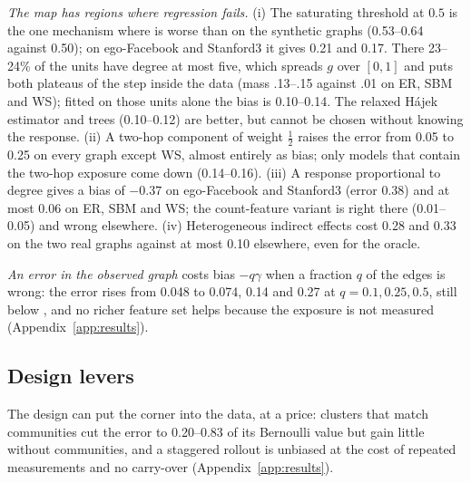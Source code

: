 \emph{The map has regions where regression fails.} (i) The saturating threshold at $0.5$ is the one mechanism where  is worse than  on the synthetic graphs (0.53--0.64 against 0.50); on ego-Facebook and Stanford3 it gives 0.21 and 0.17. There 23--24\% of the units have degree at most five, which spreads $g$ over $[0,1]$ and puts both plateaus of the step inside the data (mass .13--.15 against .01 on ER, SBM and WS); fitted on those units alone the bias is 0.10--0.14. The relaxed Hájek estimator and trees (0.10--0.12) are better, but cannot be chosen without knowing the response. (ii) A two-hop component of weight $\tfrac12$ raises the error from 0.05 to 0.25 on every graph except WS, almost entirely as bias; only models that contain the two-hop exposure come down (0.14--0.16). (iii) A response proportional to degree gives a bias of $-0.37$ on ego-Facebook and Stanford3 (error 0.38) and at most 0.06 on ER, SBM and WS; the count-feature variant is right there (0.01--0.05) and wrong elsewhere. (iv) Heterogeneous indirect effects cost 0.28 and 0.33 on the two real graphs against at most 0.10 elsewhere, even for the oracle.

\emph{An error in the observed graph} costs bias $-q\gamma$ when a fraction $q$ of the edges is wrong: the error rises from 0.048 to 0.074, 0.14 and 0.27 at $q=0.1,0.25,0.5$, still below , and no richer feature set helps because the exposure is not measured (Appendix~\ref{app:results}).

\subsection{Design levers}\label{sec:exp-c7}
The design can put the corner into the data, at a price: clusters that match communities cut the  error to 0.20--0.83 of its Bernoulli value but gain little without communities, and a staggered rollout is unbiased at the cost of repeated measurements and no carry-over (Appendix~\ref{app:results}).
